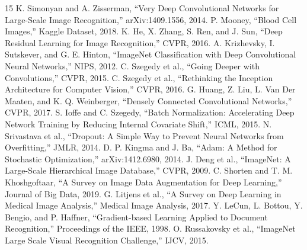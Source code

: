 \documentclass[conference]{IEEEtran}
\begin{document}
\begin{thebibliography}{15}
 K. Simonyan and A. Zisserman, ``Very Deep Convolutional Networks for Large-Scale Image Recognition,'' arXiv:1409.1556, 2014.
 P. Mooney, ``Blood Cell Images,'' Kaggle Dataset, 2018.
 K. He, X. Zhang, S. Ren, and J. Sun, ``Deep Residual Learning for Image Recognition,'' CVPR, 2016.
 A. Krizhevsky, I. Sutskever, and G. E. Hinton, ``ImageNet Classification with Deep Convolutional Neural Networks,'' NIPS, 2012.
 C. Szegedy et al., ``Going Deeper with Convolutions,'' CVPR, 2015.
 C. Szegedy et al., ``Rethinking the Inception Architecture for Computer Vision,'' CVPR, 2016.
 G. Huang, Z. Liu, L. Van Der Maaten, and K. Q. Weinberger, ``Densely Connected Convolutional Networks,'' CVPR, 2017.
 S. Ioffe and C. Szegedy, ``Batch Normalization: Accelerating Deep Network Training by Reducing Internal Covariate Shift,'' ICML, 2015.
 N. Srivastava et al., ``Dropout: A Simple Way to Prevent Neural Networks from Overfitting,'' JMLR, 2014.
 D. P. Kingma and J. Ba, ``Adam: A Method for Stochastic Optimization,'' arXiv:1412.6980, 2014.
 J. Deng et al., ``ImageNet: A Large-Scale Hierarchical Image Database,'' CVPR, 2009.
 C. Shorten and T. M. Khoshgoftaar, ``A Survey on Image Data Augmentation for Deep Learning,'' Journal of Big Data, 2019.
 G. Litjens et al., ``A Survey on Deep Learning in Medical Image Analysis,'' Medical Image Analysis, 2017.
 Y. LeCun, L. Bottou, Y. Bengio, and P. Haffner, ``Gradient-based Learning Applied to Document Recognition,'' Proceedings of the IEEE, 1998.
 O. Russakovsky et al., ``ImageNet Large Scale Visual Recognition Challenge,'' IJCV, 2015.
\end{thebibliography}
\end{document}
